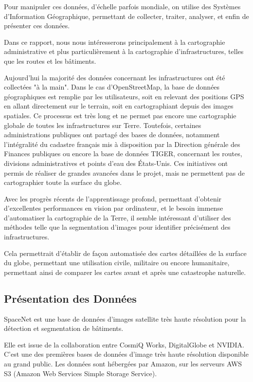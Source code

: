 \documentclass[a4paper, 11pt]{report}
\begin{document}
Pour manipuler ces données, d'échelle parfois mondiale, on utilise des Systèmes d'Information Géographique, permettant de collecter, traiter, analyser, et enfin de présenter ces données.

Dans ce rapport, nous nous intéresserons principalement à la cartographie administrative et plus particulièrement à la cartographie d'infrastructures, telles que les routes et les bâtiments.

Aujourd'hui la majorité des données concernant les infrastructures ont été collectées "à la main".
Dans le cas d'OpenStreetMap, la base de données géographiques est remplie par les utilisateurs, soit en relevant des positions GPS en allant directement sur le terrain, soit en cartographiant depuis des images spatiales.
Ce processus est très long et ne permet pas encore une cartographie globale de toutes les infrastructures sur Terre.
Toutefois, certaines administrations publiques ont partagé des bases de données, notamment l'intégralité du cadastre français mis à disposition par la Direction générale des Finances publiques ou encore la base de données TIGER, concernant les routes, divisions administratives et points d'eau des États-Unis.
Ces initiatives ont permis de réaliser de grandes avancées dans le projet, mais ne permettent pas de cartographier toute la surface du globe.


Avec les progrès récents de l'apprentissage profond, permettant d'obtenir d'excellentes performances en vision par ordinateur, et le besoin immense d'automatiser la cartographie de la Terre, il semble intéressant d'utiliser des méthodes telle que la segmentation d'images pour identifier précisément des infrastructures.

Cela permettrait d'établir de façon automatisée des cartes détaillées de la surface du globe, permettant une utilisation civile, militaire ou encore humanitaire, permettant ainsi de comparer les cartes avant et après une catastrophe naturelle.
\subsection{Présentation des Données}
SpaceNet est une base de données d'images satellite très haute résolution pour la détection et segmentation de bâtiments.

Elle est issue de la collaboration entre CosmiQ Works, DigitalGlobe et NVIDIA.
C'est une des premières bases de données d'image très haute résolution disponible au grand public.
Les données sont hébergées par Amazon, sur les serveurs AWS S3 (Amazon Web Services Simple Storage Service).
\end{document}
